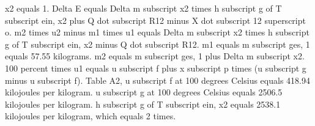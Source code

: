 x2 equals 1.
Delta E equals Delta m subscript x2 times h subscript g of T subscript ein, x2 plus Q dot subscript R12 minus X dot subscript 12 superscript o.
m2 times u2 minus m1 times u1 equals Delta m subscript x2 times h subscript g of T subscript ein, x2 minus Q dot subscript R12.
m1 equals m subscript ges, 1 equals 57.55 kilograms.
m2 equals m subscript ges, 1 plus Delta m subscript x2.
100 percent times u1 equals u subscript f plus x subscript p times (u subscript g minus u subscript f).
Table A2, u subscript f at 100 degrees Celsius equals 418.94 kilojoules per kilogram.
u subscript g at 100 degrees Celsius equals 2506.5 kilojoules per kilogram.
h subscript g of T subscript ein, x2 equals 2538.1 kilojoules per kilogram, which equals 2 times.